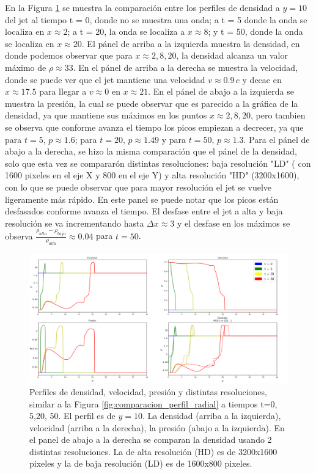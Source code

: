 \documentclass[12pt,a4paper]{book}
\begin{document}
En la Figura \ref{fig:Decaimiento_constante_densidad_jet} {\color{red} se muestra la comparación entre los perfiles de 
densidad} a $y = 10$
del jet al tiempo t = 0, donde no se muestra una onda; a t = 5 donde la onda se localiza en $x \approx 2$; 
a t = 20, la onda se localiza a $x \approx 8$; y  t = 50, donde la onda se localiza en $x \approx 20$. 
El pánel de arriba a la izquierda muestra la densidad, en donde
podemos observar que para $x \approx 2, 8, 20$,  la densidad alcanza un valor máximo de 
$\rho  \approx 33$.
En el pánel de arriba a la derecha se muestra la velocidad, donde se puede ver que el jet mantiene una velocidad 
$v \approx 0.9 \, c$ y decae en $x \approx 17.5$ para llegar a $v \approx 0 $ en  $x \approx 21$. 
En el pánel de abajo a la
izquierda se muestra la presión, la cual se puede observar que es parecido a la gráfica de la 
densidad, ya que mantiene sus máximos en los puntos $x \approx 2, 8, 20$, pero tambien se observa que conforme avanza el
tiempo los picos empiezan a decrecer, ya que para $t = 5, \, p \approx 1.6 $; 
para $t = 20, \, p \approx 1.49$ y para 
$t = 50, \, p  \approx 1.3$. Para el pánel de abajo a la derecha, se hizo la misma comparación que el pánel 
de la densidad, solo que esta vez se compararón  distintas resoluciones: baja resolución "LD" ({\color{red}
con 1600 pixeles en el eje X y 800 en el eje Y}) 
y alta resolución "HD" (3200x1600), con lo que se puede observar que 
para mayor resolución el jet se vuelve ligeramente más rápido. En este panel se puede notar que
los picos están desfasados conforme avanza el tiempo. El desfase entre el jet a alta y baja resolución 
se va incrementando hasta $\Delta x \approx 3$ y  {\color{red} el desfase en los 
máximos se observa  $\frac{\rho_{alta} - \rho_{baja}}{\rho_{alta}} \approx 0.04$} para $t = 50$.


\begin{figure}
  \centering
  \includegraphics[width = 1.0\textwidth]{./Figuras/jet/perfiles/perfiles_constantes.png}
  \caption{Perfiles de densidad, velocidad, presión y distintas resoluciones, similar a la Figura 
  \ref{fig:comparacion_perfil_radial} a tiempos t=0, 5,20, 50.
  El perfil es de $y = 10$.
  La densidad (arriba a la izquierda), velocidad (arriba a la derecha), la presión (abajo a la izquierda). 
  En el panel de abajo a la derecha se comparan la densidad usando 2 distintas resoluciones. La de alta resolución 
  (HD)
  es de 3200x1600 pixeles y la de baja resolución (LD) es de 1600x800 pixeles.}\label{fig:Decaimiento_constante_densidad_jet}
\end{figure}
\end{document}
